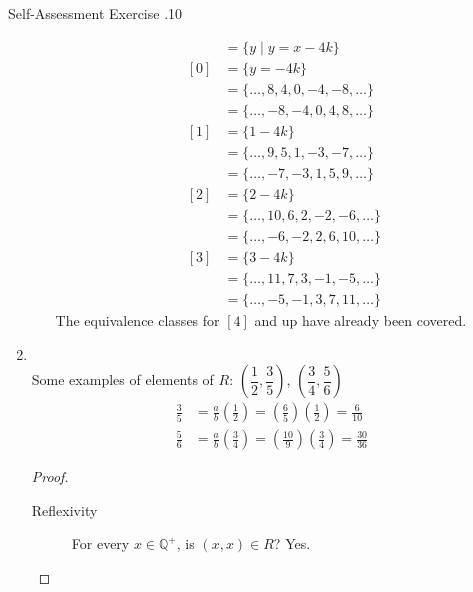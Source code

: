 \documentclass[../notes.tex]{subfiles}
\begin{document}
\begin{exercise}{Self-Assessment Exercise \thechapter.10}
\begin{enumerate}
\begin{enumerate}[label=(\alph*)]
\begin{align*}
										&= \{y \mid y = x - 4k\}\\
										[0] &= \{y = - 4k\}\\
										&= \{\ldots, 8, 4, 0, -4, -8, \ldots\}\\
										&= \{\ldots, -8, -4, 0, 4, 8, \ldots\}\\
										[1] &= \{1 - 4k\}\\
										&= \{\ldots, 9, 5, 1, -3, -7, \ldots\}\\
										&= \{\ldots, -7, -3, 1, 5, 9, \ldots\}\\
										[2] &= \{2 - 4k\}\\
										&= \{\ldots, 10, 6, 2, -2, -6, \ldots\}\\
										&= \{\ldots, -6, -2, 2, 6, 10, \ldots\}\\
										[3] &= \{3 - 4k\}\\
										&= \{\ldots, 11, 7, 3, -1, -5, \ldots\}\\
										&= \{\ldots, -5, -1, 3, 7, 11, \ldots\}
									\end{align*}
									The equivalence classes for $[4]$ and up have already been covered.
							\end{enumerate}
						\item {}\\
							Some examples of elements of $R$: $\left(\dfrac{1}{2}, \dfrac{3}{5}\right)$, $\left(\dfrac{3}{4}, \dfrac{5}{6}\right)$
								\begin{align*}
									\frac{3}{5} &= \frac{a}{b}\left(\frac{1}{2}\right) = \left(\frac{6}{5}\right)\left(\frac{1}{2}\right) = \frac{6}{10}\tag*{$a = 6$ and $b = 5$}\\
									\frac{5}{6} &= \frac{a}{b}\left(\frac{3}{4}\right) = \left(\frac{10}{9}\right)\left(\frac{3}{4}\right) = \frac{30}{36}\tag*{$a = 10$ and $b = 9$}
								\end{align*}
							\begin{proof}
								$ $
								\begin{description}
									\item[Reflexivity] For every $x \in \mathbb{Q}^{+}$, is $(x, x) \in R$? Yes.

\end{description}
\end{proof}
\end{enumerate}
\end{exercise}
\end{document}
